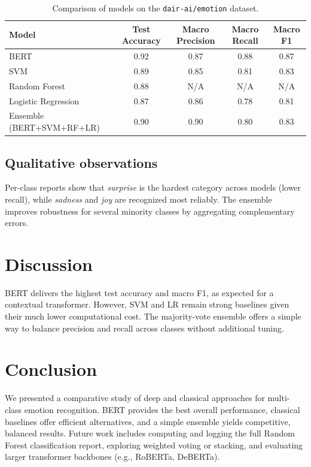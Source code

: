 \documentclass[11pt,a4paper]{article}
\begin{document}
\begin{table}[H]
\centering
\begin{tabular}{lcccc}
\toprule
\textbf{Model} & \textbf{Test Accuracy} & \textbf{Macro Precision} & \textbf{Macro Recall} & \textbf{Macro F1} \\
\midrule
BERT & 0.92 & 0.87 & 0.88 & 0.87 \\
SVM & 0.89 & 0.85 & 0.81 & 0.83 \\
Random Forest & 0.88 & N/A & N/A & N/A \\
Logistic Regression & 0.87 & 0.86 & 0.78 & 0.81 \\
Ensemble (BERT+SVM+RF+LR) & 0.90 & 0.90 & 0.80 & 0.83 \\
\bottomrule
\end{tabular}
\caption{Comparison of models on the \texttt{dair-ai/emotion} dataset.}
\label{tab:results}
\end{table}

\subsection{Qualitative observations}
Per-class reports show that \textit{surprise} is the hardest category across models (lower recall), while \textit{sadness} and \textit{joy} are recognized most reliably. The ensemble improves robustness for several minority classes by aggregating complementary errors.

\section{Discussion}
BERT delivers the highest test accuracy and macro F1, as expected for a contextual transformer. However, SVM and LR remain strong baselines given their much lower computational cost. The majority-vote ensemble offers a simple way to balance precision and recall across classes without additional tuning.

\section{Conclusion}
We presented a comparative study of deep and classical approaches for multi-class emotion recognition. BERT provides the best overall performance, classical baselines offer efficient alternatives, and a simple ensemble yields competitive, balanced results. Future work includes computing and logging the full Random Forest classification report, exploring weighted voting or stacking, and evaluating larger transformer backbones (e.g., RoBERTa, DeBERTa).



\end{document}
